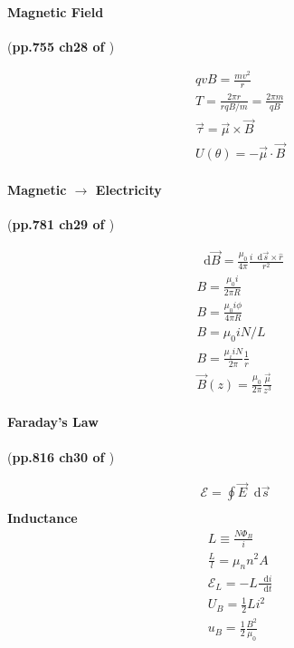 \documentclass{article}
\newcommand*\diff{\mathop{}\!\mathrm{d}}
\numberwithin{equation}{subsection} %
\theoremstyle{definition}
\begin{document}
\paragraph{Magnetic Field} (\textbf{pp.755 ch28 of \cite{book}})

\begin{align}
    & qvB = \frac{mv^2}{r} \\
    & T = \frac{2\pi r}{ rqB / m} = \frac{2\pi m}{qB} \\
    & \vec\tau = \vec{\mu} \times \vec{B} \\
    & U(\theta) = -\vec\mu \cdot \vec B
\end{align}

\paragraph{Magnetic $\to$ Electricity} (\textbf{pp.781 ch29 of
\cite{book}})

\begin{align}
    & \diff \vec{B} = \frac{\mu_0}{4\pi}
        \frac{i\diff \vec{s}\times\hat{r}}{r^2} \\
    & B = \frac{\mu_0 i}{2\pi R} \\
    & B = \frac{\mu_0 i \phi}{4\pi R} \\
    & B = \mu_0 i N/L \\
    & B = \frac{\mu_i i N}{2\pi}\frac{1}{r} \\
    & \vec{B}(z) = \frac{\mu_0}{2\pi}\frac{\vec{\mu}}{z^3}
\end{align}

\paragraph{Faraday's Law} (\textbf{pp.816 ch30 of \cite{book}})

\begin{align}
    \mathcal{E} = \oint \vec{E} \diff \vec{s} \\
\end{align}
\textbf{Inductance}
\begin{align}
    & L \equiv \frac{N\Phi_B}{i} \\
    & \frac{L}{l} = \mu_n n^2 A \\
    & \mathcal{E}_L = - L\frac{\diff i}{\diff t} \\
    & U_B = \frac{1}{2} L i^2 \\
    & u_B = \frac{1}{2} \frac{B^2}{\mu_0} 
\end{align}
\end{document}
